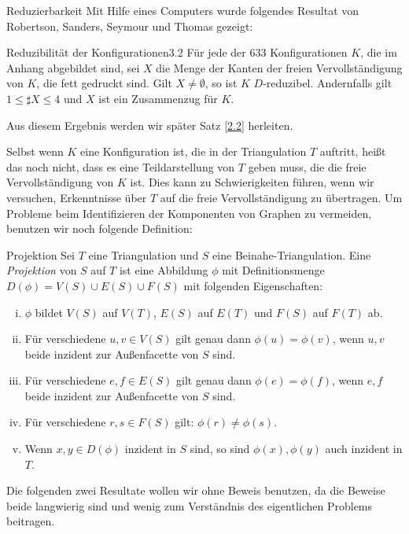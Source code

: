 \begin{section}{Reduzierbarkeit}
 Mit Hilfe eines Computers wurde folgendes Resultat von Robertson, Sanders, Seymour und Thomas gezeigt:
 
 \begin{satzl}{Reduzibilität der Konfigurationen}{3.2}
  Für jede der 633 Konfigurationen $K$, die im Anhang abgebildet sind, sei $X$ die Menge der Kanten der freien Vervollständigung von $K$, die fett gedruckt sind. Gilt $X \neq \emptyset$, so ist $K$ $D$-reduzibel. Andernfalls gilt $1\leq \sharp X \leq 4$ und $X$ ist ein Zusammenzug für $K$.
 \end{satzl}
 
 Aus diesem Ergebnis werden wir später Satz \ref{2.2} herleiten.

 Selbst wenn $K$ eine Konfiguration ist, die in der Triangulation $T$ auftritt, heißt das noch nicht, dass es eine Teildarstellung von $T$ geben muss, die die freie Vervollständigung von $K$ ist. Dies kann zu Schwierigkeiten führen, wenn wir versuchen, Erkenntnisse über $T$ auf die freie Vervollständigung zu übertragen. Um Probleme beim Identifizieren der Komponenten von Graphen zu vermeiden, benutzen wir noch folgende Definition:
 
 \begin{definition}{Projektion}
  Sei $T$ eine Triangulation und $S$ eine Beinahe-Triangulation. Eine \textit{Projektion} von $S$ auf $T$ ist eine Abbildung $\phi$ mit Definitionsmenge $D(\phi) = V(S)\cup E(S)\cup F(S)$ mit folgenden Eigenschaften:
  \begin{enumerate}[(i)]
   \item $\phi$ bildet $V(S)$ auf $V(T)$, $E(S)$ auf $E(T)$ und $F(S)$ auf $F(T)$ ab.
   \item Für verschiedene $u,v \in V(S)$ gilt genau dann $\phi(u) = \phi(v)$, wenn $u,v$ beide inzident zur Außenfacette von $S$ sind.
   \item Für verschiedene $e,f \in E(S)$ gilt genau dann $\phi(e) = \phi(f)$, wenn $e,f$ beide inzident zur Außenfacette von $S$ sind.
   \item Für verschiedene $r,s \in F(S)$ gilt: $\phi(r) \neq \phi(s)$.
   \item Wenn $x,y \in D(\phi)$ inzident in $S$ sind, so sind $\phi(x),\phi(y)$ auch inzident in $T$.
  \end{enumerate}
 \end{definition}
 
 Die folgenden zwei Resultate wollen wir ohne Beweis benutzen, da die Beweise beide langwierig sind und wenig zum Verständnis des eigentlichen Problems beitragen.


\end{section}
